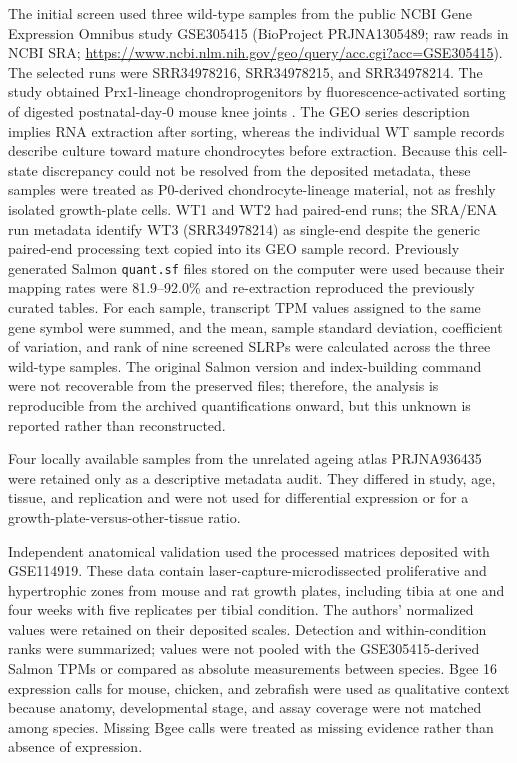 The initial screen used three wild-type samples from the public NCBI Gene
Expression Omnibus study GSE305415 (BioProject PRJNA1305489; raw reads in
NCBI SRA; \url{https://www.ncbi.nlm.nih.gov/geo/query/acc.cgi?acc=GSE305415}).
The selected runs were SRR34978216, SRR34978215, and SRR34978214. The study
obtained Prx1-lineage chondroprogenitors by fluorescence-activated sorting of
digested postnatal-day-0 mouse knee joints \citep{John2026}. The GEO series
description implies RNA extraction after sorting, whereas the individual WT
sample records describe culture toward mature chondrocytes before extraction.
Because this cell-state discrepancy could not be resolved from the deposited
metadata, these samples were treated as P0-derived chondrocyte-lineage material,
not as freshly isolated growth-plate cells. WT1 and WT2 had paired-end runs;
the SRA/ENA run metadata identify WT3 (SRR34978214) as single-end despite the
generic paired-end processing text copied into its GEO sample record.
Previously generated Salmon
\texttt{quant.sf} files stored on the computer were
used because their mapping rates were 81.9--92.0\% and re-extraction reproduced
the previously curated tables. For each sample, transcript TPM values assigned
to the same gene symbol were summed, and the mean, sample standard deviation,
coefficient of variation, and rank of
nine screened SLRPs were calculated across the three wild-type samples. The
original Salmon version and index-building command were not recoverable from the
preserved files; therefore, the analysis is reproducible from the archived
quantifications onward, but this unknown is reported rather than reconstructed.

Four locally available samples from the unrelated ageing atlas PRJNA936435 were
retained only as a descriptive metadata audit. They differed in study, age,
tissue, and replication and were not used for differential expression or for a
growth-plate-versus-other-tissue ratio.

Independent anatomical validation used the processed matrices deposited with
GSE114919. These data contain laser-capture-microdissected proliferative and
hypertrophic zones from mouse and rat growth plates, including tibia at one and
four weeks with five replicates per tibial condition. The authors' normalized
values were retained on their deposited scales. Detection and within-condition
ranks were summarized; values were not pooled with the GSE305415-derived Salmon
TPMs or compared as absolute measurements between species. Bgee 16 expression
calls for mouse, chicken, and zebrafish were used as qualitative context because anatomy,
developmental stage, and assay coverage were not matched among species. Missing
Bgee calls were treated as missing evidence rather than absence of expression.

